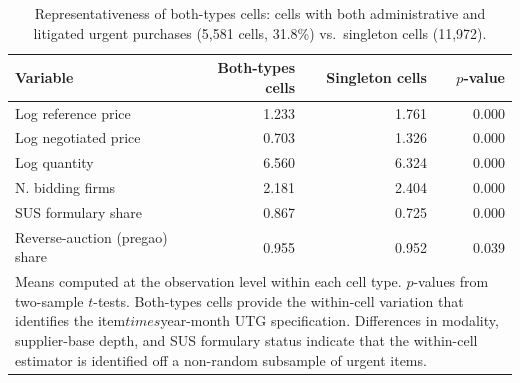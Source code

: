 \begin{table}

\caption{\label{tab:both_types_cells}Representativeness of both-types cells: cells with both administrative and litigated urgent purchases (5,581 cells, 31.8\%) vs.\ singleton cells (11,972).}
\centering
\begin{tabular}[t]{lrrr}
\toprule
Variable & Both-types cells & Singleton cells & $p$-value\\
\midrule
Log reference price & 1.233 & 1.761 & 0.000\\
Log negotiated price & 0.703 & 1.326 & 0.000\\
Log quantity & 6.560 & 6.324 & 0.000\\
N. bidding firms & 2.181 & 2.404 & 0.000\\
SUS formulary share & 0.867 & 0.725 & 0.000\\
\addlinespace
Reverse-auction (pregao) share & 0.955 & 0.952 & 0.039\\
\bottomrule
\multicolumn{4}{l}{\rule{0pt}{1em}Means computed at the observation level within each cell type. $p$-values from two-sample $t$-tests. Both-types cells provide the within-cell variation that identifies the item$times$year-month UTG specification. Differences in modality, supplier-base depth, and SUS formulary status indicate that the within-cell estimator is identified off a non-random subsample of urgent items.}\\
\end{tabular}
\end{table}
